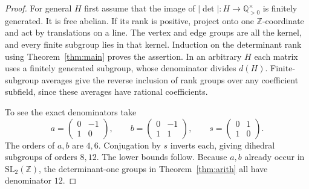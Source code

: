 \documentclass[11pt,a4paper,reqno]{amsart}
\numberwithin{equation}{section}
\theoremstyle{remark}
\newcommand{\Q}{\mathbb Q}
\newcommand{\Z}{\mathbb Z}
\begin{document}
\begin{proof}
For general \(H\) first assume that the image of \(|\det|:H\to\Q_{>0}^{\times}\) is finitely generated. It is free abelian. If its rank is positive, project onto one \(\Z\)-coordinate and act by translations on a line. The vertex and edge groups are all the kernel, and every finite subgroup lies in that kernel. Induction on the determinant rank using Theorem~\ref{thm:main} proves the assertion. In an arbitrary \(H\) each matrix uses a finitely generated subgroup, whose denominator divides \(d(H)\). Finite-subgroup averages give the reverse inclusion of rank groups over any coefficient subfield, since these averages have rational coefficients.

To see the exact denominators take
\[
 a=\begin{pmatrix}0&-1\\1&0\end{pmatrix},\qquad
 b=\begin{pmatrix}0&-1\\1&1\end{pmatrix},\qquad
 s=\begin{pmatrix}0&1\\1&0\end{pmatrix}.
\]
The orders of \(a,b\) are \(4,6\). Conjugation by \(s\) inverts each, giving dihedral subgroups of orders \(8,12\). The lower bounds follow. Because \(a,b\) already occur in \(\mathrm{SL}_2(\Z)\), the determinant-one groups in Theorem~\ref{thm:arith} all have denominator \(12\).
\end{proof}
\end{document}
